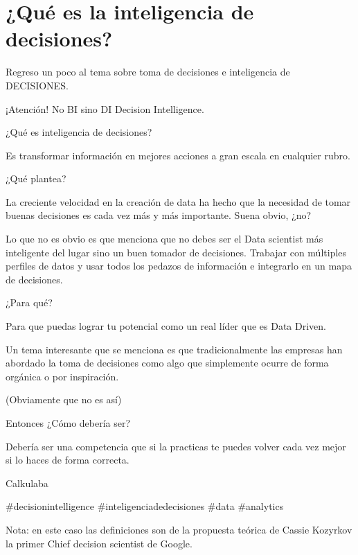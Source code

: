 \chapter{¿Qué es la inteligencia de decisiones?}
\label{Cap1}
Regreso un poco al tema sobre toma de decisiones e inteligencia de DECISIONES. 


¡Atención! No BI sino DI Decision Intelligence. 


¿Qué es inteligencia de decisiones? 


Es transformar información en mejores acciones a gran escala en cualquier rubro. 


¿Qué plantea? 


La creciente velocidad en la creación de data ha hecho que la necesidad de tomar buenas decisiones es cada vez más y más importante. Suena obvio, ¿no? 


Lo que no es obvio es que menciona que no debes ser el Data scientist más inteligente del lugar sino un buen tomador de decisiones. Trabajar con múltiples perfiles de datos y usar todos los pedazos de información e integrarlo en un mapa de decisiones. 


¿Para qué?


Para que puedas lograr tu potencial como un real líder que es Data Driven. 


Un tema interesante que se menciona es que tradicionalmente las empresas han abordado la toma de decisiones como algo que simplemente ocurre de forma orgánica o por inspiración. 


(Obviamente que no es así)


Entonces ¿Cómo debería ser?


Debería ser una competencia que si la practicas te puedes volver cada vez mejor si lo haces de forma correcta. 


Calkulaba


#decisionintelligence #inteligenciadedecisiones #data #analytics


Nota: en este caso las definiciones son de la propuesta teórica de Cassie Kozyrkov la primer Chief decision scientist de Google. 

